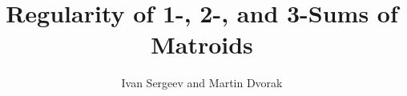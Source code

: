 
\title{Regularity of 1-, 2-, and 3-Sums of Matroids}
\author{Ivan Sergeev and Martin Dvorak}

\usepackage{amsmath} %
\usepackage{amssymb} %
\usepackage{amsthm} %
\usepackage[unicode,colorlinks=true,linkcolor=blue,urlcolor=magenta,citecolor=blue]{hyperref}  %
\usepackage{tikz}  %

\newtheorem{theorem}{Theorem}
\theoremstyle{definition}
\newtheorem{lemma}[theorem]{Lemma}
\newtheorem{definition}[theorem]{Definition}

\newcommand{\SeeLean}{See implementation in Lean.}

